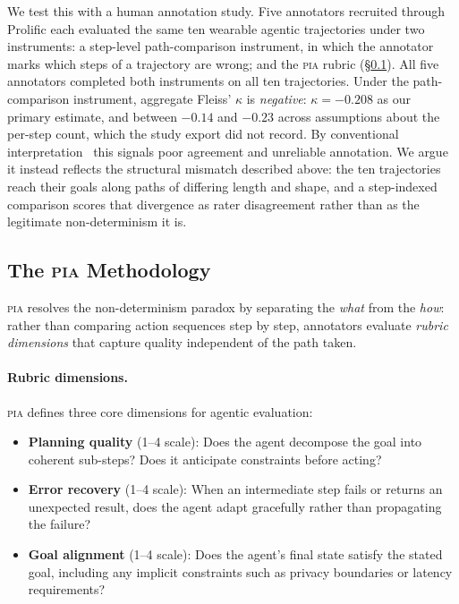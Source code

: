 \documentclass{article}
\newcommand{\PIA}{\textsc{pia}}          %
\begin{document}
We test this with a human annotation study. Five annotators recruited
through Prolific each evaluated the same ten wearable agentic trajectories
under two instruments: a step-level path-comparison instrument, in which the
annotator marks which steps of a trajectory are wrong; and the \PIA{} rubric
(\S\ref{sec:pia:method}). All five annotators completed both instruments on
all ten trajectories.
%
Under the path-comparison instrument, aggregate Fleiss' $\kappa$ is
\emph{negative}: $\kappa = -0.208$ as our primary estimate, and between
$-0.14$ and $-0.23$ across assumptions about the per-step count, which the
study export did not record.
%
By conventional interpretation~\cite{fleiss1971} this signals poor agreement
and unreliable annotation. We argue it instead reflects the structural
mismatch described above: the ten trajectories reach their goals along paths
of differing length and shape, and a step-indexed comparison scores that
divergence as rater disagreement rather than as the legitimate
non-determinism it is.

\subsection{The \PIA{} Methodology}
\label{sec:pia:method}

\PIA{} resolves the non-determinism paradox by separating the \emph{what}
from the \emph{how}: rather than comparing action sequences step by step,
annotators evaluate \emph{rubric dimensions} that capture quality independent
of the path taken.

\paragraph{Rubric dimensions.}
\PIA{} defines three core dimensions for agentic evaluation:

\begin{itemize}[nosep]
  \item \textbf{Planning quality} (1--4 scale): Does the agent decompose
        the goal into coherent sub-steps? Does it anticipate constraints
        before acting?
  \item \textbf{Error recovery} (1--4 scale): When an intermediate step
        fails or returns an unexpected result, does the agent adapt
        gracefully rather than propagating the failure?
  \item \textbf{Goal alignment} (1--4 scale): Does the agent's final
        state satisfy the stated goal, including any implicit constraints
        such as privacy boundaries or latency requirements?
\end{itemize}
\end{document}
